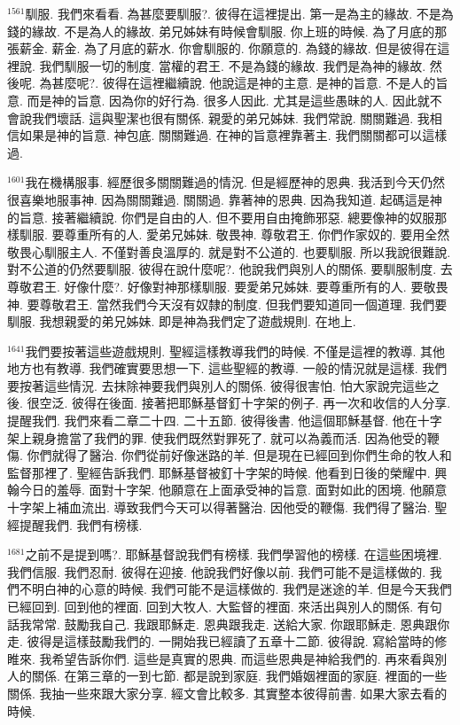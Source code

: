 \documentclass{book}
\begin{document}
$^{1561}$馴服.
我們來看看.
為甚麼要馴服?.
彼得在這裡提出.
第一是為主的緣故.
不是為錢的緣故.
不是為人的緣故.
弟兄姊妹有時候會馴服.
你上班的時候.
為了月底的那張薪金.
薪金.
為了月底的薪水.
你會馴服的.
你願意的.
為錢的緣故.
但是彼得在這裡說.
我們馴服一切的制度.
當權的君王.
不是為錢的緣故.
我們是為神的緣故.
然後呢.
為甚麼呢?.
彼得在這裡繼續說.
他說這是神的主意.
是神的旨意.
不是人的旨意.
而是神的旨意.
因為你的好行為.
很多人因此.
尤其是這些愚昧的人.
因此就不會說我們壞話.
這與聖潔也很有關係.
親愛的弟兄姊妹.
我們常說.
關關難過.
我相信如果是神的旨意.
神包底.
關關難過.
在神的旨意裡靠著主.
我們關關都可以這樣過.

$^{1601}$我在機構服事.
經歷很多關關難過的情況.
但是經歷神的恩典.
我活到今天仍然很喜樂地服事神.
因為關關難過.
關關過.
靠著神的恩典.
因為我知道.
起碼這是神的旨意.
接著繼續說.
你們是自由的人.
但不要用自由掩飾邪惡.
總要像神的奴服那樣馴服.
要尊重所有的人.
愛弟兄姊妹.
敬畏神.
尊敬君王.
你們作家奴的.
要用全然敬畏心馴服主人.
不僅對善良溫厚的.
就是對不公道的.
也要馴服.
所以我說很難說.
對不公道的仍然要馴服.
彼得在說什麼呢?.
他說我們與別人的關係.
要馴服制度.
去尊敬君王.
好像什麼?.
好像對神那樣馴服.
要愛弟兄姊妹.
要尊重所有的人.
要敬畏神.
要尊敬君王.
當然我們今天沒有奴隸的制度.
但我們要知道同一個道理.
我們要馴服.
我想親愛的弟兄姊妹.
即是神為我們定了遊戲規則.
在地上.

$^{1641}$我們要按著這些遊戲規則.
聖經這樣教導我們的時候.
不僅是這裡的教導.
其他地方也有教導.
我們確實要思想一下.
這些聖經的教導.
一般的情況就是這樣.
我們要按著這些情況.
去抹除神要我們與別人的關係.
彼得很害怕.
怕大家說完這些之後.
很空泛.
彼得在後面.
接著把耶穌基督釘十字架的例子.
再一次和收信的人分享.
提醒我們.
我們來看二章二十四.
二十五節.
彼得後書.
他這個耶穌基督.
他在十字架上親身擔當了我們的罪.
使我們既然對罪死了.
就可以為義而活.
因為他受的鞭傷.
你們就得了醫治.
你們從前好像迷路的羊.
但是現在已經回到你們生命的牧人和監督那裡了.
聖經告訴我們.
耶穌基督被釘十字架的時候.
他看到日後的榮耀中.
興翰今日的羞辱.
面對十字架.
他願意在上面承受神的旨意.
面對如此的困境.
他願意十字架上補血流出.
導致我們今天可以得著醫治.
因他受的鞭傷.
我們得了醫治.
聖經提醒我們.
我們有榜樣.

$^{1681}$之前不是提到嗎?.
耶穌基督說我們有榜樣.
我們學習他的榜樣.
在這些困境裡.
我們信服.
我們忍耐.
彼得在迎接.
他說我們好像以前.
我們可能不是這樣做的.
我們不明白神的心意的時候.
我們可能不是這樣做的.
我們是迷途的羊.
但是今天我們已經回到.
回到他的裡面.
回到大牧人.
大監督的裡面.
來活出與別人的關係.
有句話我常常.
鼓勵我自己.
我跟耶穌走.
恩典跟我走.
送給大家.
你跟耶穌走.
恩典跟你走.
彼得是這樣鼓勵我們的.
一開始我已經讀了五章十二節.
彼得說.
寫給當時的修睢來.
我希望告訴你們.
這些是真實的恩典.
而這些恩典是神給我們的.
再來看與別人的關係.
在第三章的一到七節.
都是說到家庭.
我們婚姻裡面的家庭.
裡面的一些關係.
我抽一些來跟大家分享.
經文會比較多.
其實整本彼得前書.
如果大家去看的時候.
\end{document}

